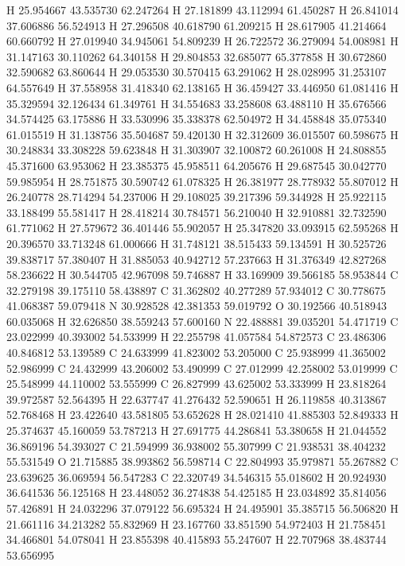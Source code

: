 \documentclass{article}
\begin{document}
H 25.954667 43.535730 62.247264
H 27.181899 43.112994 61.450287
H 26.841014 37.606886 56.524913
H 27.296508 40.618790 61.209215
H 28.617905 41.214664 60.660792
H 27.019940 34.945061 54.809239
H 26.722572 36.279094 54.008981
H 31.147163 30.110262 64.340158
H 29.804853 32.685077 65.377858
H 30.672860 32.590682 63.860644
H 29.053530 30.570415 63.291062
H 28.028995 31.253107 64.557649
H 37.558958 31.418340 62.138165
H 36.459427 33.446950 61.081416
H 35.329594 32.126434 61.349761
H 34.554683 33.258608 63.488110
H 35.676566 34.574425 63.175886
H 33.530996 35.338378 62.504972
H 34.458848 35.075340 61.015519
H 31.138756 35.504687 59.420130
H 32.312609 36.015507 60.598675
H 30.248834 33.308228 59.623848
H 31.303907 32.100872 60.261008
H 24.808855 45.371600 63.953062
H 23.385375 45.958511 64.205676
H 29.687545 30.042770 59.985954
H 28.751875 30.590742 61.078325
H 26.381977 28.778932 55.807012
H 26.240778 28.714294 54.237006
H 29.108025 39.217396 59.344928
H 25.922115 33.188499 55.581417
H 28.418214 30.784571 56.210040
H 32.910881 32.732590 61.771062
H 27.579672 36.401446 55.902057
H 25.347820 33.093915 62.595268
H 20.396570 33.713248 61.000666
H 31.748121 38.515433 59.134591
H 30.525726 39.838717 57.380407
H 31.885053 40.942712 57.237663
H 31.376349 42.827268 58.236622
H 30.544705 42.967098 59.746887
H 33.169909 39.566185 58.953844
C 32.279198 39.175110 58.438897
C 31.362802 40.277289 57.934012
C 30.778675 41.068387 59.079418
N 30.928528 42.381353 59.019792
O 30.192566 40.518943 60.035068
H 32.626850 38.559243 57.600160
N 22.488881 39.035201 54.471719
C 23.022999 40.393002 54.533999
H 22.255798 41.057584 54.872573
C 23.486306 40.846812 53.139589
C 24.633999 41.823002 53.205000
C 25.938999 41.365002 52.986999
C 24.432999 43.206002 53.490999
C 27.012999 42.258002 53.019999
C 25.548999 44.110002 53.555999
C 26.827999 43.625002 53.333999
H 23.818264 39.972587 52.564395
H 22.637747 41.276432 52.590651
H 26.119858 40.313867 52.768468
H 23.422640 43.581805 53.652628
H 28.021410 41.885303 52.849333
H 25.374637 45.160059 53.787213
H 27.691775 44.286841 53.380658
H 21.044552 36.869196 54.393027
C 21.594999 36.938002 55.307999
C 21.938531 38.404232 55.531549
O 21.715885 38.993862 56.598714
C 22.804993 35.979871 55.267882
C 23.639625 36.069594 56.547283
C 22.320749 34.546315 55.018602
H 20.924930 36.641536 56.125168
H 23.448052 36.274838 54.425185
H 23.034892 35.814056 57.426891
H 24.032296 37.079122 56.695324
H 24.495901 35.385715 56.506820
H 21.661116 34.213282 55.832969
H 23.167760 33.851590 54.972403
H 21.758451 34.466801 54.078041
H 23.855398 40.415893 55.247607
H 22.707968 38.483744 53.656995
~    
   
\end{document}
